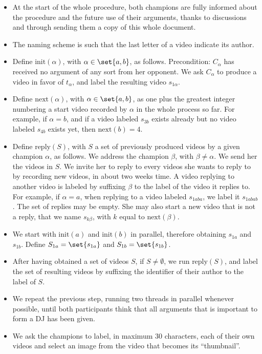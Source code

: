 \documentclass[version=3.21, pagesize, twoside=off, bibliography=totoc, DIV=calc, fontsize=12pt, a4paper]{scrartcl}
\begin{document}
\begin{itemize}
	\item At the start of the whole procedure, both champions are fully informed about the procedure and the future use of their arguments, thanks to discussions and through sending them a copy of this whole document.
	\item The naming scheme is such that the last letter of a video indicate its author.
	\item Define $\text{init}(\alpha)$, with $\alpha \in \set{a, b}$, as follows. Precondition: $C_\alpha$ has received no argument of any sort from her opponent. We ask $C_\alpha$ to produce a video in favor of $t_\alpha$, and label the resulting video $s_{1 \alpha}$.
	\item Define $\text{next}(\alpha)$, with $\alpha \in \set{a, b}$, as one plus the greatest integer numbering a start video recorded by $\alpha$ in the whole process so far. For example, if $\alpha = b$, and if a video labeled $s_{3b}$ exists already but no video labeled $s_{4b}$ exists yet, then $\text{next}(b) = 4$.
	\item Define $\text{reply}(S)$, with $S$ a set of previously produced videos by a given champion $\alpha$, as follows. We address the champion $\beta$, with $\beta ≠ \alpha$. We send her the videos in $S$. We invite her to reply to every videos she wants to reply to by recording new videos, in about two weeks time. A video replying to another video is labeled by suffixing $\beta$ to the label of the video it replies to. For example, if $\alpha = a$, when replying to a video labeled $s_{1aba}$, we label it $s_{1abab}$. The set of replies may be empty. She may also start a new video that is not a reply, that we name $s_{k\beta}$, with $k$ equal to $\text{next}(\beta)$.
	\item We start with $\text{init}(a)$ and $\text{init}(b)$ in parallel, therefore obtaining $s_{1a}$ and $s_{1b}$. Define $S_{1a} = \set{s_{1a}}$ and $S_{1b} = \set{s_{1b}}$.
	\item After having obtained a set of videos $S$, if $S ≠ \emptyset$, we run $\text{reply}(S)$, and label the set of resulting videos by suffixing the identifier of their author to the label of $S$. 
	\item We repeat the previous step, running two threads in parallel whenever possible, until both participants think that all arguments that is important to form a \ac{DJ} has been given.
	\item We ask the champions to label, in maximum 30 characters, each of their own videos and select an image from the video that becomes its “thumbnail”.
\end{itemize}
\end{document}
